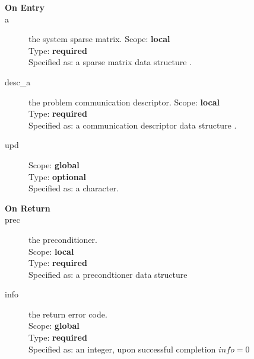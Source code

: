

\begin{description}
\item[\bf On Entry]
\item[a] the system sparse matrix.
Scope: {\bf local} \\
Type: {\bf required}\\
Specified as: a sparse matrix data structure \spdata.
\item[desc\_a] the problem communication descriptor. 
Scope: {\bf local} \\
Type: {\bf required}\\
Specified as: a communication descriptor data structure \descdata.
\item[upd] 
Scope: {\bf global} \\
Type: {\bf optional}\\
Specified as: a character.
\end{description}

\begin{description}
\item[\bf On Return]
\item[prec] the preconditioner.\\
Scope: {\bf local} \\
Type: {\bf required}\\
Specified as: a precondtioner data structure \precdata\\
\item[info] the return error code.\\
Scope: {\bf global} \\
Type: {\bf required}\\
Specified as: an integer, upon successful completion $info=0$ \\
\end{description}





